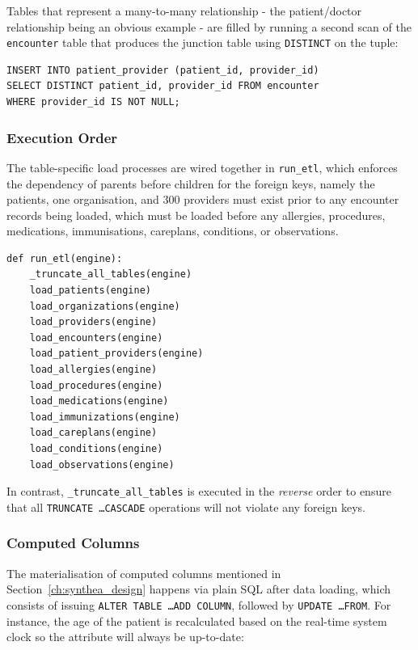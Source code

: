 Tables that represent a many-to-many relationship - the patient/doctor relationship being an obvious example - are filled by running a second scan of the \texttt{encounter} table that produces the junction table using \texttt{DISTINCT} on the tuple:

\begin{lstlisting}[style=sqlstyle]
INSERT INTO patient_provider (patient_id, provider_id)
SELECT DISTINCT patient_id, provider_id FROM encounter
WHERE provider_id IS NOT NULL;
\end{lstlisting}

\subsubsection*{Execution Order}

The table-specific load processes are wired together in \texttt{run\_etl}, which enforces the dependency of parents before children for the foreign keys, namely the patients, one organisation, and 300 providers must exist prior to any encounter records being loaded, which must be loaded before any allergies, procedures, medications, immunisations, careplans, conditions, or observations.

\begin{lstlisting}[style=pythonstyle]
def run_etl(engine):
    _truncate_all_tables(engine)
    load_patients(engine)
    load_organizations(engine)
    load_providers(engine)
    load_encounters(engine)
    load_patient_providers(engine)
    load_allergies(engine)
    load_procedures(engine)
    load_medications(engine)
    load_immunizations(engine)
    load_careplans(engine)
    load_conditions(engine)
    load_observations(engine)
\end{lstlisting}

In contrast, \texttt{\_truncate\_all\_tables} is executed in the \emph{reverse} order to ensure that all \texttt{TRUNCATE \dots CASCADE} operations will not violate any foreign keys.

\subsubsection*{Computed Columns}

The materialisation of computed columns mentioned in Section~\ref{ch:synthea_design} happens via plain SQL after data loading, which consists of issuing \texttt{ALTER TABLE \dots ADD COLUMN}, followed by \texttt{UPDATE \dots FROM}. For instance, the age of the patient is recalculated based on the real-time system clock so the attribute will always be up-to-date:

